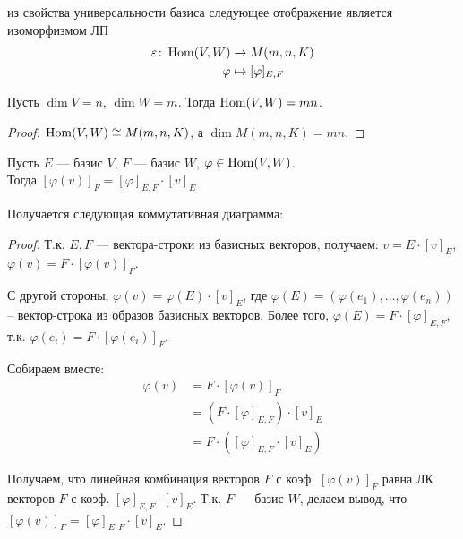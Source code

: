\follow из свойства универсальности базиса следующее отображение
является изоморфизмом ЛП
\begin{align*}
    \varepsilon \colon \operatorname{Hom}(V, W) &\to M(m, n, K)\\
    \varphi &\mapsto [ \varphi ]_{E, F}
\end{align*}

\follow Пусть $\dim V = n$, $\dim W = m$. Тогда $\operatorname{Hom}(V, W) = mn$.
\begin{proof}
    $\operatorname{Hom}(V, W) \cong M(m, n, K)$, а $\dim M(m, n, K) = mn$.
\end{proof}

\begin{theorem}
    Пусть $E$ --- базис $V$, $F$ --- базис $W$, $\varphi \in \operatorname{Hom}(V, W)$. \\
    Тогда $[\varphi(v)]_F = [\varphi]_{E, F} \cdot [v]_E$
\end{theorem}
Получается следующая коммутативная диаграмма:
\begin{center}
\end{center}
\begin{proof}
    Т.к. $E, F$ --- вектора-строки из базисных векторов, получаем: 
    $v = E \cdot [v]_E$,  $\varphi(v) = F \cdot [\varphi(v)]_F$.

    С другой стороны, $\varphi(v) = \varphi(E) \cdot [v]_E$, где
    $\varphi(E) = (\varphi(e_1), \dots, \varphi(e_n))$ -- вектор-строка
    из образов базисных векторов. Более того, 
    $\varphi(E) = F \cdot [\varphi]_{E, F}$, т.к. 
    $\varphi(e_i) = F \cdot [\varphi(e_i)]_F$.

    Собираем вместе:
    \begin{align*}
        \varphi(v) &= F \cdot [\varphi(v)]_F \\
        &= (F \cdot [\varphi]_{E, F}) \cdot [v]_E \\
        &= F \cdot ([\varphi]_{E, F} \cdot [v]_E)
    \end{align*}

    Получаем, что линейная комбинация векторов $F$ с коэф.
    $[\varphi(v)]_F$ равна ЛК векторов $F$ с коэф.
    $[\varphi]_{E, F} \cdot [v]_E$. Т.к. $F$ --- базис $W$, делаем вывод,
    что $[\varphi(v)]_F = [\varphi]_{E, F} \cdot [v]_E$.
\end{proof}

